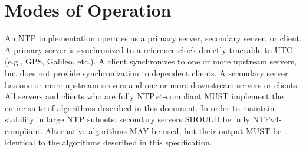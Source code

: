 \chapter{Modes of Operation}
\label{section-2}

An NTP implementation operates as a primary server, secondary server,
or client. A primary server is synchronized to a reference clock
directly traceable to UTC (e.g., GPS, Galileo, etc.). A client
synchronizes to one or more upstream servers, but does not provide
synchronization to dependent clients. A secondary server has one or
more upstream servers and one or more downstream servers or clients.
All servers and clients who are fully NTPv4-compliant MUST implement
the entire suite of algorithms described in this document. In order
to maintain stability in large NTP subnets, secondary servers SHOULD
be fully NTPv4-compliant. Alternative algorithms MAY be used, but
their output MUST be identical to the algorithms described in this
specification.

